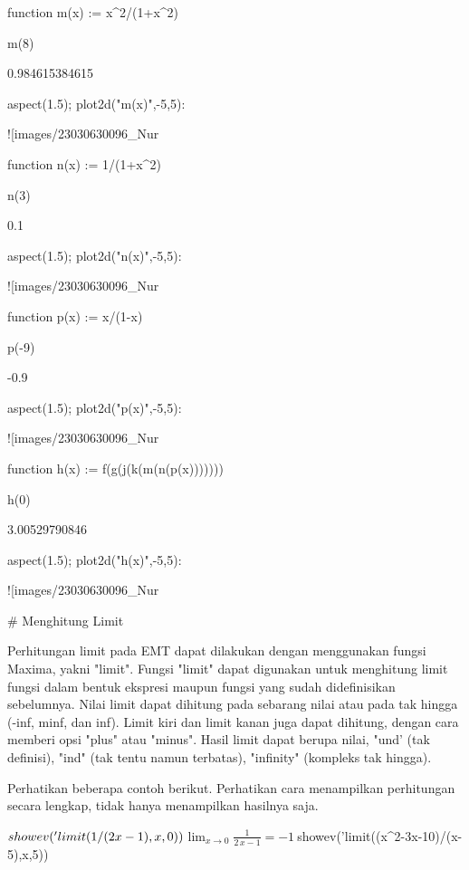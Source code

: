 \documentclass{article}
\begin{document}
\>function m(x) := x^2/(1+x^2)

\> m(8)


    0.984615384615

\>aspect(1.5); plot2d("m(x)",-5,5):


![images/23030630096_Nur%

\> function n(x) := 1/(1+x^2)

\> n(3)


    0.1

\>aspect(1.5); plot2d("n(x)",-5,5):


![images/23030630096_Nur%

\> function p(x) := x/(1-x)

\> p(-9)


    -0.9

\>aspect(1.5); plot2d("p(x)",-5,5):


![images/23030630096_Nur%

\>function h(x) := f(g(j(k(m(n(p(x)))))))

\> h(0)


    3.00529790846

\>aspect(1.5); plot2d("h(x)",-5,5):


![images/23030630096_Nur%

# Menghitung Limit

Perhitungan limit pada EMT dapat dilakukan dengan menggunakan fungsi Maxima, yakni "limit".
Fungsi "limit" dapat digunakan untuk menghitung limit fungsi dalam bentuk ekspresi maupun
fungsi yang sudah didefinisikan sebelumnya. Nilai limit dapat dihitung pada sebarang nilai
atau pada tak hingga (-inf, minf, dan inf). Limit kiri dan limit kanan juga dapat dihitung,
dengan cara memberi opsi "plus" atau "minus". Hasil limit dapat berupa nilai, "und' (tak
definisi), "ind" (tak tentu namun terbatas), "infinity" (kompleks tak hingga).


Perhatikan beberapa contoh berikut. Perhatikan cara menampilkan perhitungan secara lengkap,
tidak hanya menampilkan hasilnya saja.


\>$showev('limit(1/(2\*x-1),x,0))


$$\lim_{x\rightarrow 0}{\frac{1}{2\,x-1}}=-1$$\>$showev('limit((x^2-3\*x-10)/(x-5),x,5))
\end{document}

